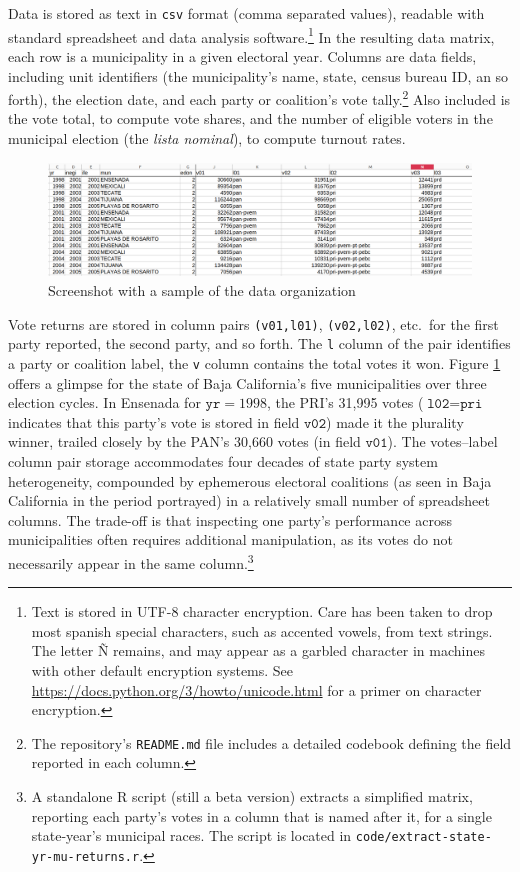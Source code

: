 \documentclass[letter,12pt]{article}
\newcommand{\emm}[1]{\todo[color=red!15, inline]{\textbf{Eric:} #1}}
\begin{document}
Data is stored as text in \verb|csv| format (comma separated values), readable with standard spreadsheet and data analysis software.\footnote{Text is stored in UTF-8 character encryption. Care has been taken to drop most spanish special characters, such as accented vowels, from text strings. The letter \~N remains, and may appear as a garbled character in machines with other default encryption systems. See \url{https://docs.python.org/3/howto/unicode.html} for a primer on character encryption.} In the resulting data matrix, each row is a municipality in a given electoral year. Columns are data fields, including unit identifiers (the municipality's name, state, census bureau ID, an so forth), the election date, and each party or coalition's vote tally.\footnote{The repository's \verb|README.md| file includes a detailed codebook defining the field reported in each column.} Also included is the vote total, to compute vote shares, and the number of eligible voters in the municipal election (the \emph{lista nominal}), to compute turnout rates.  

\begin{figure}
  \centering
  \includegraphics[width=\columnwidth]{pics/eg-spreadsheet-columns.png}
  \caption{Screenshot with a sample of the data organization}\label{F:scrn}
\end{figure}  

Vote returns are stored in column pairs \verb|(v01,l01)|, \verb|(v02,l02)|, etc.\ for the first party reported, the second party, and so forth. The \verb|l| column of the pair identifies a party or coalition label, the \verb|v| column contains the total votes it won. Figure \ref{F:scrn} offers a glimpse for the state of Baja California's five municipalities over three election cycles. In Ensenada for $\texttt{yr} = 1998$, the PRI's 31,995 votes ($\texttt{l02} = \texttt{pri}$ indicates that this party's vote is stored in field $\texttt{v02}$) made it the plurality winner, trailed closely by the PAN's 30,660 votes (in field $\texttt{v01}$). The votes--label column pair storage accommodates four decades of state party system heterogeneity, compounded by ephemerous electoral coalitions (as seen in Baja California in the period portrayed) in a relatively small number of spreadsheet columns. The trade-off is that inspecting one party's performance across municipalities often requires additional manipulation, as its votes do not necessarily appear in the same column.\footnote{A standalone R script (still a beta version) extracts a simplified matrix, reporting each party's votes in a column that is named after it, for a single state-year's municipal races. The script is located in \verb|code/extract-state-yr-mu-returns.r|.} %
\end{document}
